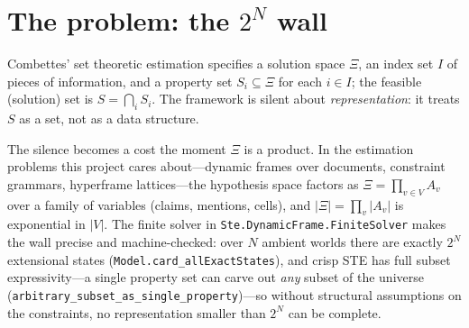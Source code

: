 \documentclass[11pt]{article}
\newcommand{\lean}[1]{\texttt{#1}}
\newcommand{\Xii}{\Xi}
\begin{document}
\begin{abstract}
\lean{not\_forall\_cechObstruction\_le\_rectCoverNumber}); what holds
instead is the fooling sandwich $\mathrm{fool}(T) \le \rho(T) \le |T|$
with $\rho(T) = 1$ iff the obstruction vanishes and
$\rho(\mathrm{allEqual}) = |\alpha|$ exactly.  The
``adaptive consistency is a complete, width-bounded solver'' theorem is
now also mechanized (\lean{Ste.AdaptiveSolver}): projective bucket
elimination on an order achieving width $w$ decides feasibility,
extracts a concrete solution backtrack-free, and stays within
$\operatorname{tw} \le w$, all in one statement
(\lean{projectBucketEliminate\_complete\_solver}); moreover the abstract
bucket network of \lean{Ste.AdaptiveConsistency} is realized as a scoped
list whose joint constraint is \emph{literally} the network's solution
set (\lean{joinConstraint\_bucketNetworkList}), so the solver operates on
it directly and returns a genuine \lean{AdaptiveSolution}
(\lean{adaptiveNetwork\_solved\_by\_elimination}) --- joining the two
formalisms in Lean.  What stays genuinely open is now narrower still:
constructing the width-$w$ elimination order from a separator width
bound, and efficient computation of treewidth, which is NP-hard
\citep{arnborg1987complexity,freuder1982backtrack,grohe2007complexity,dechter2003constraint}.
\end{abstract}

\section{The problem: the $2^N$ wall}

Combettes' set theoretic estimation \citep{combettes1993} specifies a
solution space $\Xii$, an index set $I$ of pieces of information, and a
property set $S_i \subseteq \Xii$ for each $i \in I$; the feasible
(solution) set is $S = \bigcap_{i} S_i$.  The framework is silent about
\emph{representation}: it treats $S$ as a set, not as a data structure.

The silence becomes a cost the moment $\Xii$ is a product.  In the
estimation problems this project cares about---dynamic frames over
documents, constraint grammars, hyperframe lattices---the hypothesis
space factors as $\Xii = \prod_{v \in V} A_v$ over a family of
variables (claims, mentions, cells), and $|\Xii| = \prod_v |A_v|$ is
exponential in $|V|$.  The finite solver in
\lean{Ste.DynamicFrame.FiniteSolver} makes the wall precise and
machine-checked: over $N$ ambient worlds there are exactly $2^N$
extensional states (\lean{Model.card\_allExactStates}), and crisp STE
has full subset expressivity---a single property set can carve out
\emph{any} subset of the universe
(\lean{arbitrary\_subset\_as\_single\_property})---so without structural
assumptions on the constraints, no representation smaller than $2^N$
can be complete.
\end{document}
